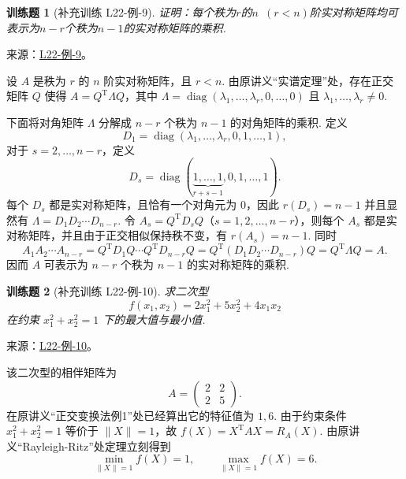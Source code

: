 \documentclass[UTF8,12pt,a4paper,fontset=fandol]{ctexart}
\newtheorem{exercise}{训练题}[section]
\begin{document}
\begin{exercise}[补充训练 L22-例-9]\label{prob:L22-例-9}
证明：每个秩为$r$的$n\enspace(r<n)$阶实对称矩阵均可表示为$n-r$个秩为$n-1$的实对称矩阵的乘积.
\end{exercise}
\noindent 来源：\href{https://github.com/yhwu-is/Linear-Algebra-Left-Undone/blob/new/%E8%AE%B2%E4%B9%89/%E4%B8%93%E9%A2%98/22%20%E4%BA%8C%E6%AC%A1%E5%9E%8B.tex}{L22-例-9}。
\begin{solve}
设 $A$ 是秩为 $r$ 的 $n$ 阶实对称矩阵，且 $r<n$. 由原讲义“实谱定理”处，存在正交矩阵 $Q$ 使得 $A=Q^\mathrm{T}\Lambda Q$，其中 $\Lambda=\operatorname{diag}(\lambda_1,\ldots,\lambda_r,0,\ldots,0)$ 且 $\lambda_1,\ldots,\lambda_r\neq 0$.

    下面将对角矩阵 $\Lambda$ 分解成 $n-r$ 个秩为 $n-1$ 的对角矩阵的乘积. 定义
    \[
        D_1=\operatorname{diag}(\lambda_1,\ldots,\lambda_r,0,1,\ldots,1),
    \]
    对于 $s=2,\ldots,n-r$，定义
    \[
        D_s=\operatorname{diag}(\underbrace{1,\ldots,1}_{r+s-1},0,1,\ldots,1).
    \]
    每个 $D_s$ 都是实对称矩阵，且恰有一个对角元为 $0$，因此 $r(D_s)=n-1$ 并且显然有 $\Lambda=D_1D_2\cdots D_{n-r}$. 令 $A_s=Q^\mathrm{T}D_sQ$（$s=1,2,\ldots,n-r$），则每个 $A_s$ 都是实对称矩阵，并且由于正交相似保持秩不变，有 $r(A_s)=n-1$. 同时
    \[
        A_1A_2\cdots A_{n-r}
        =Q^\mathrm{T}D_1Q\cdots Q^\mathrm{T}D_{n-r}Q
        =Q^\mathrm{T}(D_1D_2\cdots D_{n-r})Q
        =Q^\mathrm{T}\Lambda Q
        =A.
    \]
    因而 $A$ 可表示为 $n-r$ 个秩为 $n-1$ 的实对称矩阵的乘积.
\end{solve}

\begin{exercise}[补充训练 L22-例-10]\label{prob:L22-例-10}
求二次型
    \[
        f(x_1,x_2)=2x_1^2+5x_2^2+4x_1x_2
    \]
    在约束 $x_1^2+x_2^2=1$ 下的最大值与最小值.
\end{exercise}
\noindent 来源：\href{https://github.com/yhwu-is/Linear-Algebra-Left-Undone/blob/new/%E8%AE%B2%E4%B9%89/%E4%B8%93%E9%A2%98/22%20%E4%BA%8C%E6%AC%A1%E5%9E%8B.tex}{L22-例-10}。
\begin{solve}
该二次型的相伴矩阵为
    \[
        A=\begin{pmatrix}
            2 & 2 \\
            2 & 5
        \end{pmatrix}.
    \]
    在原讲义“正交变换法例1”处已经算出它的特征值为 $1,6$. 由于约束条件 $x_1^2+x_2^2=1$ 等价于 $\|X\|=1$，故 $f(X)=X^\mathrm{T}AX=R_A(X)$. 由原讲义“Rayleigh-Ritz”处定理立刻得到
    \[
        \min_{\|X\|=1}f(X)=1,\qquad \max_{\|X\|=1}f(X)=6.
    \]
\end{solve}
\end{document}
